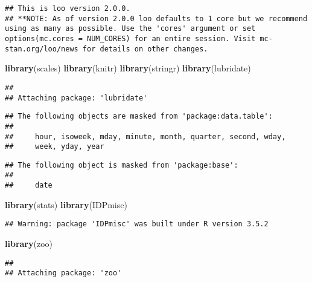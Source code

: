 \documentclass[]{article}
\newenvironment{Shaded}{\begin{snugshade}}{\end{snugshade}}
\newcommand{\KeywordTok}[1]{\textcolor[rgb]{0.13,0.29,0.53}{\textbf{#1}}}
\newcommand{\NormalTok}[1]{#1}
\begin{document}
\begin{verbatim}
## This is loo version 2.0.0.
## **NOTE: As of version 2.0.0 loo defaults to 1 core but we recommend using as many as possible. Use the 'cores' argument or set options(mc.cores = NUM_CORES) for an entire session. Visit mc-stan.org/loo/news for details on other changes.
\end{verbatim}

\begin{Shaded}
\begin{Highlighting}[]
\KeywordTok{library}\NormalTok{(scales)}
\KeywordTok{library}\NormalTok{(knitr)}
\KeywordTok{library}\NormalTok{(stringr)}
\KeywordTok{library}\NormalTok{(lubridate)}
\end{Highlighting}
\end{Shaded}

\begin{verbatim}
## 
## Attaching package: 'lubridate'
\end{verbatim}

\begin{verbatim}
## The following objects are masked from 'package:data.table':
## 
##     hour, isoweek, mday, minute, month, quarter, second, wday,
##     week, yday, year
\end{verbatim}

\begin{verbatim}
## The following object is masked from 'package:base':
## 
##     date
\end{verbatim}

\begin{Shaded}
\begin{Highlighting}[]
\KeywordTok{library}\NormalTok{(stats) }
\KeywordTok{library}\NormalTok{(IDPmisc)}
\end{Highlighting}
\end{Shaded}

\begin{verbatim}
## Warning: package 'IDPmisc' was built under R version 3.5.2
\end{verbatim}

\begin{Shaded}
\begin{Highlighting}[]
\KeywordTok{library}\NormalTok{(zoo)}
\end{Highlighting}
\end{Shaded}

\begin{verbatim}
## 
## Attaching package: 'zoo'
\end{verbatim}
\end{document}
